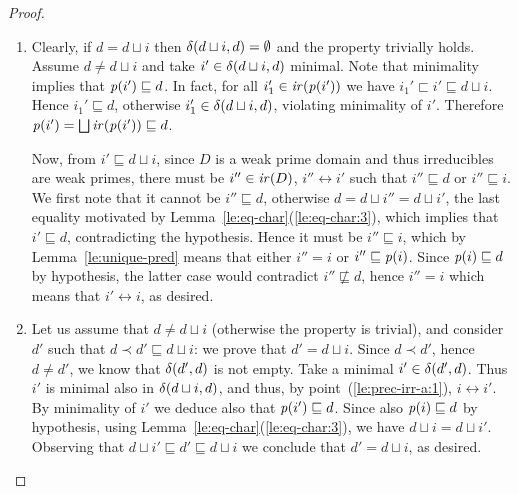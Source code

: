 \begin{proof}
  \begin{enumerate}
  \item Clearly, if $d = d \sqcup i$ {then $\delta({d \sqcup i},{d}) = \emptyset$ and 
   the property trivially
    holds.} Assume $d \neq d \sqcup i$ and take
    $i' \in \delta({d \sqcup i},{d})$ minimal. Note that minimality
    implies that $\mathit{p}({i'}) \sqsubseteq d$. In fact, for all
    {$i_1' \in \mathop{\mathit{ir}({\mathit{p}({i'})})}$} we have
    $i_1' \sqsubset i' \sqsubseteq d \sqcup i$. Hence
    $i_1' \sqsubseteq d$, otherwise ${i_1'} \in \delta({d \sqcup i},{d})$,
    violating minimality of $i'$. Therefore
    $\mathit{p}({i'}) = \bigsqcup \mathop{\mathit{ir}({\mathit{p}({i'})})} \sqsubseteq d$.

    Now, from $i' \sqsubseteq d \sqcup i$, since $D$ is a weak prime
    domain and thus irreducibles are weak primes, there must be
    $i'' \in \mathop{\mathit{ir}({D})}$, $i'' \leftrightarrow i'$ such that
    $i'' \sqsubseteq d$ or $i'' \sqsubseteq i$. We first note that it
    cannot be $i'' \sqsubseteq d$, otherwise
    $d = d \sqcup i'' = d \sqcup i'$, the last equality motivated by
    Lemma~\ref{le:eq-char}(\ref{le:eq-char:3}), {which implies that 
    $i' \sqsubseteq d$,} contradicting the hypothesis. 
    {Hence it must be $i'' \sqsubseteq i$, 
    which by Lemma~\ref{le:unique-pred} means that either $i'' = i$ or $i'' \sqsubseteq \mathit{p}({i})$. Since $\mathit{p}({i}) \sqsubseteq d$ by hypothesis, the latter 
    case would contradict $i'' \not \sqsubseteq d$, hence $i'' = i$ which means
    that $i' \leftrightarrow i$, as desired.}
    

  \item {Let us assume  that $d \not = d \sqcup i$ (otherwise the property is trivial), and} consider $d'$ such that $d \prec d' \sqsubseteq d \sqcup i$:
   we prove that $d' = d \sqcup i$. Since $d \prec d'$, hence
    $d \neq d'$, we know that $\delta({d'},{d})$ is not empty. Take a
    minimal $i' \in \delta({d'},{d})$. Thus $i'$ is minimal also in
    $\delta({d \sqcup i},{d})$, and thus, by point~(\ref{le:prec-irr-a:1}),
    $i \leftrightarrow i'$. By minimality of $i'$ we deduce also that
    $\mathit{p}({i'}) \sqsubseteq d$. Since also $\mathit{p}({i}) \sqsubseteq d$ by
    hypothesis, using Lemma~\ref{le:eq-char}(\ref{le:eq-char:3}), we have
    $d \sqcup i = d \sqcup i'$.  Observing that
    $d \sqcup i' \sqsubseteq d' \sqsubseteq d \sqcup i$ we conclude
    that $d' = d \sqcup i$, as desired.
  \end{enumerate}
  
\end{proof}



